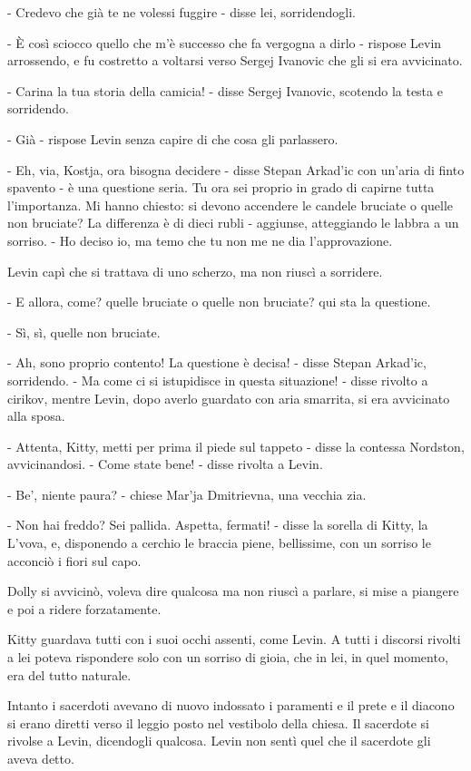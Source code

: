 - Credevo che già te ne volessi fuggire - disse lei, sorridendogli. 

- È così sciocco quello che m'è successo che fa vergogna a dirlo - rispose Levin arrossendo, e fu costretto a voltarsi verso Sergej Ivanovic che gli si era avvicinato. 

- Carina la tua storia della camicia! - disse Sergej Ivanovic, scotendo la testa e sorridendo. 

- Già - rispose Levin senza capire di che cosa gli parlassero. 

- Eh, via, Kostja, ora bisogna decidere - disse Stepan Arkad'ic con un'aria di finto spavento - è una questione seria. Tu ora sei proprio in grado di capirne tutta l'importanza. Mi hanno chiesto: si devono accendere le candele bruciate o quelle non bruciate? La differenza è di dieci rubli - aggiunse, atteggiando le labbra a un sorriso. - Ho deciso io, ma temo che tu non me ne dia l'approvazione. 

Levin capì che si trattava di uno scherzo, ma non riuscì a sorridere. 

- E allora, come? quelle bruciate o quelle non bruciate? qui sta la questione. 

- Sì, sì, quelle non bruciate. 

- Ah, sono proprio contento! La questione è decisa! - disse Stepan Arkad'ic, sorridendo. - Ma come ci si istupidisce in questa situazione! - disse rivolto a cirikov, mentre Levin, dopo averlo guardato con aria smarrita, si era avvicinato alla sposa. 

- Attenta, Kitty, metti per prima il piede sul tappeto - disse la contessa Nordston, avvicinandosi. - Come state bene! - disse rivolta a Levin. 

- Be', niente paura? - chiese Mar'ja Dmitrievna, una vecchia zia. 

- Non hai freddo? Sei pallida. Aspetta, fermati! - disse la sorella di Kitty, la L'vova, e, disponendo a cerchio le braccia piene, bellissime, con un sorriso le acconciò i fiori sul capo. 

Dolly si avvicinò, voleva dire qualcosa ma non riuscì a parlare, si mise a piangere e poi a ridere forzatamente. 

Kitty guardava tutti con i suoi occhi assenti, come Levin. A tutti i discorsi rivolti a lei poteva rispondere solo con un sorriso di gioia, che in lei, in quel momento, era del tutto naturale. 

Intanto i sacerdoti avevano di nuovo indossato i paramenti e il prete e il diacono si erano diretti verso il leggio posto nel vestibolo della chiesa. Il sacerdote si rivolse a Levin, dicendogli qualcosa. Levin non sentì quel che il sacerdote gli aveva detto. 

